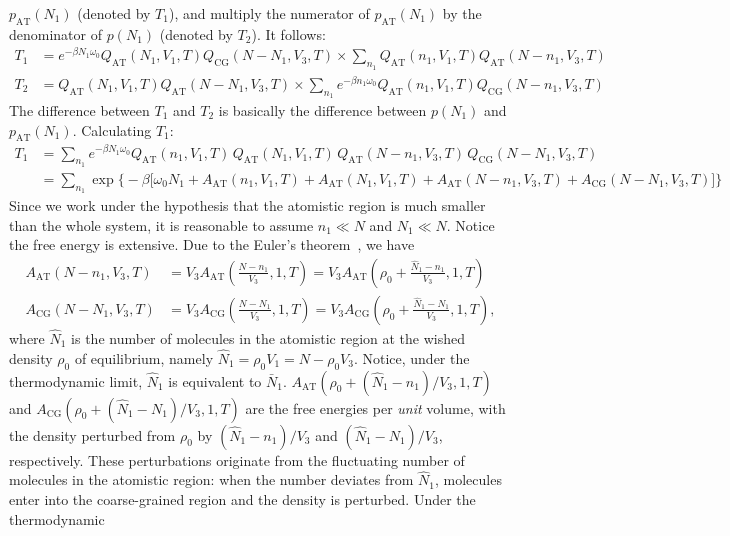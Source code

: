 \documentclass[aip,jcp,a4paper,reprint,onecolumn]{revtex4-1}
\newcommand{\AT}{{\textrm{{AT}}}}
\newcommand{\CG}{{\textrm{CG}}}
\begin{document}
$p_{\AT}(N_1)$ (denoted by $T_1$),
and multiply the numerator of $p_{\AT}(N_1)$
by the denominator of $p(N_1)$ (denoted by $T_2$). It follows:
\begin{align}
  T_1
  &=
  e^{-\beta N_1\omega_0}
  Q_{\AT}(N_1,V_1,T) Q_{\CG}(N-N_1,V_3,T)
  \times
  \sum_{n_1}
  Q_{\AT}(n_1,V_1,T) Q_{\AT}(N-n_1,V_3,T)\\
  T_2
  &=
  Q_{\AT}(N_1,V_1,T) Q_{\AT}(N-N_1,V_3,T)
  \times
  \sum_{n_1}
  e^{-\beta n_1\omega_0}
  Q_{\AT}(n_1,V_1,T) Q_{\CG}(N-n_1,V_3,T)
\end{align}
The difference between $T_1$ and $T_2$ is basically the difference
between $p(N_1)$ and $p_{\AT}(N_1)$.
Calculating $T_1$:
\begin{align}\nonumber
  T_1
  &=
  \sum_{n_1}
  e^{-\beta N_1\omega_0}
  Q_{\AT}(n_1,V_1,T)\,
  Q_{\AT}(N_1,V_1,T)\,
  Q_{\AT}(N-n_1,V_3,T)\,
  Q_{\CG}(N-N_1,V_3,T) \\\label{eqn:t1-1}
  &=
  \sum_{n_1}
  \exp
  \big\{-\beta
  \big[
  \omega_0N_1 +
  A_{\AT}(n_1,V_1,T) +
  A_{\AT}(N_1,V_1,T) +
  A_{\AT}(N-n_1,V_3,T) +
  A_{\CG}(N-N_1,V_3,T)
  \big]
  \big\}
\end{align}
Since we work under the hypothesis that the atomistic region is much smaller than the whole system, it
is reasonable to assume $n_1 \ll N$ and $N_1\ll N$.
Notice the free energy is extensive.
Due to the Euler's theorem~\cite{tuckeman2010statistical},
we have
\begin{align}\label{eqn:Aat-0}
  A_{\AT}(N-n_1,V_3,T)
  &= V_3 A_{\AT}(\frac{N-n_1}{V_3},1,T)
  = V_3 A_{\AT}(\rho_0 + \frac{\hat N_1 - n_1}{V_3},1,T)\\\label{eqn:Acg-0}
  A_{\CG}(N-N_1,V_3,T)
  &= V_3 A_{\CG}(\frac{N-N_1}{V_3},1,T)
  = V_3 A_{\CG}(\rho_0 + \frac{\hat N_1 - N_1}{V_3},1,T),
\end{align}
where $\hat N_1$ is the number of molecules in the atomistic region
at the wished density $\rho_0$ of equilibrium, namely
$\hat N_1 = \rho_0V_1 = N - \rho_0 V_3$.
Notice, under the thermodynamic limit, $\hat N_1$ is equivalent to
$\bar N_1$.
$A_{\AT}(\rho_0 + (\hat N_1 - n_1)/{V_3},1,T)$ and
$A_{\CG}(\rho_0 + (\hat N_1 - N_1)/{V_3},1,T)$ are
the free energies per \emph{unit} volume, with
the density perturbed from $\rho_0$ by  $(\hat N_1 - n_1)/{V_3}$
and $(\hat N_1 - N_1)/{V_3}$, respectively.
These perturbations originate from the fluctuating
number of molecules in the atomistic region: when the number
deviates from $\hat N_1$, molecules enter into the coarse-grained
region and the density is perturbed.
Under the thermodynamic
\end{document}
